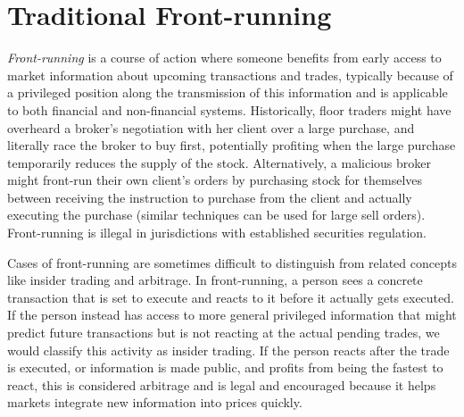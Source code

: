 
\section{Traditional Front-running}
\label{sec:What is front-running?}

\emph{Front-running} is a course of action where someone benefits from early access to market information about upcoming transactions and trades, typically because of a privileged position along the transmission of this information and is applicable to both financial and non-financial systems. Historically, floor traders might have overheard a broker's negotiation with her client over a large purchase, and literally race the broker to buy first, potentially profiting when the large purchase temporarily reduces the supply of the stock. Alternatively, a malicious broker might front-run their own client's orders by purchasing stock for themselves between receiving the instruction to purchase from the client and actually executing the purchase (similar techniques can be used for large sell orders). Front-running is illegal in jurisdictions with established securities regulation.

Cases of front-running are sometimes difficult to distinguish from related concepts like insider trading and arbitrage. In front-running, a person sees a concrete transaction that is set to execute and reacts to it before it actually gets executed. If the person instead has access to more general privileged information that might predict future transactions but is not reacting at the actual pending trades, we would classify this activity as insider trading. If the person reacts after the trade is executed, or information is made public, and profits from being the fastest to react, this is considered arbitrage and is legal and encouraged because it helps markets integrate new information into prices quickly.

